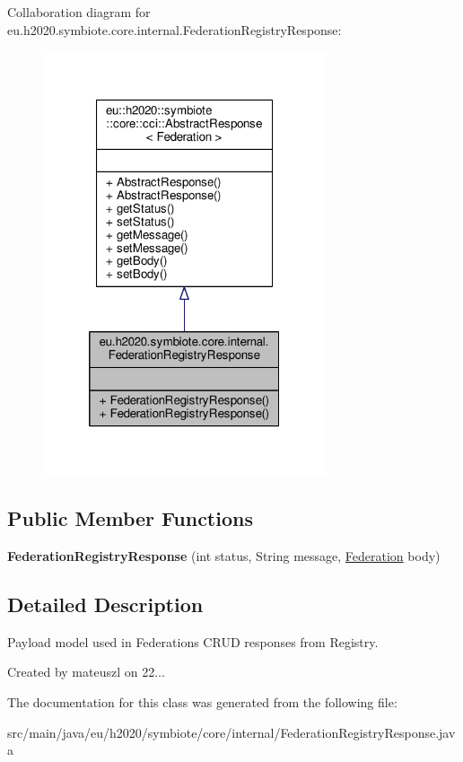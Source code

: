 Collaboration diagram for eu.\+h2020.\+symbiote.\+core.\+internal.\+Federation\+Registry\+Response\+:\nopagebreak
\begin{figure}[H]
\begin{center}
\leavevmode
\includegraphics[width=236pt]{classeu_1_1h2020_1_1symbiote_1_1core_1_1internal_1_1FederationRegistryResponse__coll__graph}
\end{center}
\end{figure}
\subsection*{Public Member Functions}
\begin{DoxyCompactItemize}
\item 
\mbox{\label{classeu_1_1h2020_1_1symbiote_1_1core_1_1internal_1_1FederationRegistryResponse_ab9d6a1c41979a79f29703202003a8931}} 
{\bfseries Federation\+Registry\+Response} (int status, String message, \hyperlink{classeu_1_1h2020_1_1symbiote_1_1model_1_1mim_1_1Federation}{Federation} body)
\end{DoxyCompactItemize}


\subsection{Detailed Description}
Payload model used in Federations C\+R\+UD responses from Registry.

Created by mateuszl on 22... 

The documentation for this class was generated from the following file\+:\begin{DoxyCompactItemize}
\item 
src/main/java/eu/h2020/symbiote/core/internal/Federation\+Registry\+Response.\+java\end{DoxyCompactItemize}
